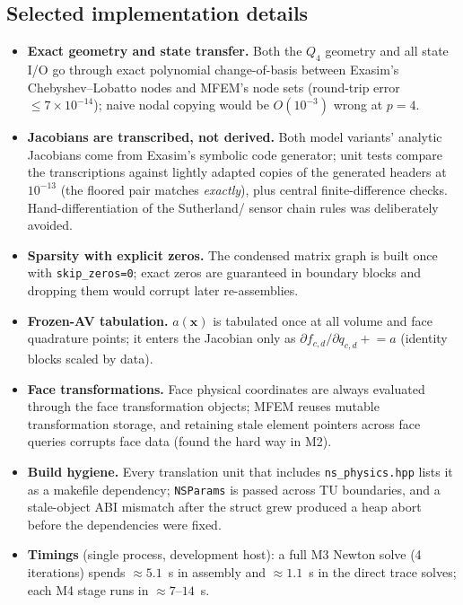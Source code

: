 \documentclass[11pt]{article}
\newcommand{\bx}{\mathbf{x}}
\newcommand{\code}[1]{\texttt{#1}}
\begin{document}
\subsection{Selected implementation details}

\begin{itemize}
\item \textbf{Exact geometry and state transfer.} Both the $Q_4$ geometry
and all state I/O go through exact polynomial change-of-basis between
Exasim's Chebyshev--Lobatto nodes and MFEM's node sets (round-trip error
$\le 7\times10^{-14}$); naive nodal copying would be $O(10^{-3})$ wrong at
$p=4$.
\item \textbf{Jacobians are transcribed, not derived.} Both model variants'
analytic Jacobians come from Exasim's symbolic code generator; unit tests
compare the transcriptions against lightly adapted copies of the generated
headers at $10^{-13}$ (the floored pair matches \emph{exactly}), plus
central finite-difference checks. Hand-differentiation of the Sutherland/
sensor chain rules was deliberately avoided.
\item \textbf{Sparsity with explicit zeros.} The condensed matrix graph is
built once with \code{skip\_zeros=0}; exact zeros are guaranteed in boundary
blocks and dropping them would corrupt later re-assemblies.
\item \textbf{Frozen-AV tabulation.} $a(\bx)$ is tabulated once at all
volume and face quadrature points; it enters the Jacobian only as
$\partial f_{c,d}/\partial q_{c,d} \mathrel{+}= a$ (identity blocks scaled
by data).
\item \textbf{Face transformations.} Face physical coordinates are always
evaluated through the face transformation objects; MFEM reuses mutable
transformation storage, and retaining stale element pointers across face
queries corrupts face data (found the hard way in M2).
\item \textbf{Build hygiene.} Every translation unit that includes
\code{ns\_physics.hpp} lists it as a makefile dependency; \code{NSParams}
is passed across TU boundaries, and a stale-object ABI mismatch after the
struct grew produced a heap abort before the dependencies were fixed.
\item \textbf{Timings} (single process, development host): a full M3 Newton
solve (4 iterations) spends $\approx 5.1$~s in assembly and $\approx 1.1$~s
in the direct trace solves; each M4 stage runs in $\approx 7$--$14$~s.
\end{itemize}
\end{document}
